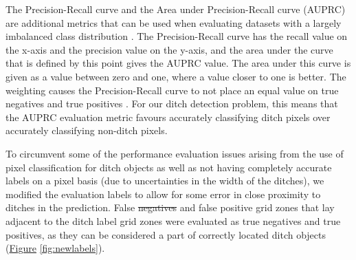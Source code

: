 \documentclass[]{interact}
\theoremstyle{plain}%
\theoremstyle{definition}
\theoremstyle{remark}
\providecommand{\DIFaddtex}[1]{{\protect\color{blue}\uwave{#1}}} %
\providecommand{\DIFdeltex}[1]{{\protect\color{red}\sout{#1}}}                      %
\providecommand{\DIFaddbegin}{} %
\providecommand{\DIFaddend}{} %
\providecommand{\DIFdelbegin}{} %
\providecommand{\DIFdelend}{} %
\providecommand{\DIFadd}[1]{\texorpdfstring{\DIFaddtex{#1}}{#1}} %
\providecommand{\DIFdel}[1]{\texorpdfstring{\DIFdeltex{#1}}{}} %
\begin{document}
The Precision-Recall curve and the Area under Precision-Recall curve (AUPRC) are additional metrics that can be used when evaluating datasets with a largely imbalanced class distribution \citep{precision_recall_curve}. The Precision-Recall curve has the recall value on the x-axis and the precision value on the y-axis, and the area under the curve that is defined by this point gives the AUPRC value. The area under this curve is given as a value between zero and one, where a value closer to one is better. The weighting causes the Precision-Recall curve to not place an equal value on true negatives and true positives \citep{precision_recall_curve}. For our ditch detection problem, this means that the AUPRC evaluation metric favours accurately classifying ditch pixels over accurately classifying non-ditch pixels.

To circumvent some of the performance evaluation issues arising from the use of pixel classification for ditch objects as well as not having completely accurate labels on a pixel basis (due to uncertainties in the width of the ditches), we modified the evaluation labels to allow for some error in close proximity to ditches in the prediction. False \DIFdelbegin \DIFdel{negatives }\DIFdelend \DIFaddbegin \DIFadd{negative }\DIFaddend and false positive grid zones that lay adjacent to the ditch label grid zones were evaluated as true negatives and true positives, as they can be considered a part of correctly located ditch objects (\hyperref[fig:newlabels]{Figure} \ref{fig:newlabels}).
\end{document}
